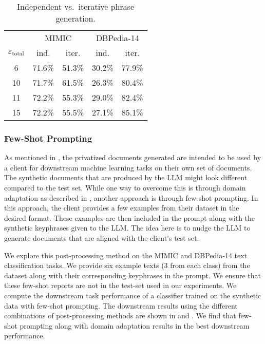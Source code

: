 \begin{table}
\caption{Independent vs.~iterative phrase generation.} \label{tbl:iidvsiter}
  \centering
\begin{tabular}{c c c c c}
\toprule
 & \multicolumn{2}{c}{MIMIC} & \multicolumn{2}{c}{DBPedia-14} \\
 $\varepsilon_{\mathrm{total}}$ & ind. & iter. & ind. & iter. \\
\midrule
\rule{0pt}{3ex}
6 & 71.6\% & 51.3\% & 30.2\% & 77.9\% \\
10 & 71.7\% & 61.5\% & 26.3\% & 80.4\% \\
11 & 72.2\% & 55.3\% & 29.0\% & 82.4\% \\
15 & 72.2\% & 55.5\% & 27.1\% & 85.1\% \\
\bottomrule
\end{tabular}
\end{table}



\subsubsection{Few-Shot Prompting}\label{app:fewshot}

As mentioned in , the privatized documents generated are intended to be used by a client for downstream machine learning tasks on their own set of documents. The synthetic documents that are produced by the LLM might look different compared to the test set. While one way to overcome this is through domain adaptation as described in , another approach is through few-shot prompting. 
%
In this approach, the client provides a few examples from their dataset in the desired format. These examples are then included in the prompt along with the synthetic keyphrases given to the LLM. The idea here is to nudge the LLM to generate documents that are aligned with the client's test set. 

We explore this post-processing method on the MIMIC and DBPedia-14 text classification tasks. We provide six example texts (3 from each class) from the dataset along with their corresponding keyphrases in the prompt. We ensure that these few-shot reports are not in the test-set used in our experiments. We compute the downstream task performance of a classifier trained on the synthetic data with few-shot prompting. The downstream results using the different combinations of post-processing methods are shown in  and . We find that few-shot prompting along with domain adaptation results in the best downstream performance. 


